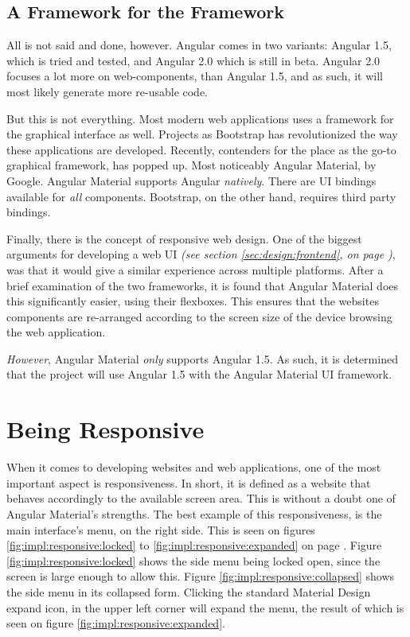 		\subsection{A Framework for the Framework}
			All is not said and done, however. Angular comes in two variants: Angular 1.5, which is tried and tested, and Angular 2.0 which is still in beta. Angular 2.0 focuses a lot more on web-components, than Angular 1.5, and as such, it will most likely generate more re-usable code. 

			But this is not everything. Most modern web applications uses a framework for the graphical interface as well. Projects as Bootstrap has revolutionized the way these applications are developed. Recently, contenders for the place as the go-to graphical framework, has popped up. Most noticeably Angular Material, by Google. Angular Material supports Angular \emph{natively}. There are UI bindings available for \emph{all} components. Bootstrap, on the other hand, requires third party bindings. 

			Finally, there is the concept of responsive web design. One of the biggest arguments for developing a web UI \emph{(see section \ref{sec:design:frontend}, on page \pageref{sec:design:frontend})}, was that it would give a similar experience across multiple platforms. After a brief examination of the two frameworks, it is found that Angular Material does this significantly easier, using their flexboxes. This ensures that the websites components are re-arranged according to the screen size of the device browsing the web application.

			\emph{However}, Angular Material \emph{only} supports Angular 1.5. As such, it is determined that the project will use Angular 1.5 with the Angular Material UI framework.



	\section{Being Responsive}
		When it comes to developing websites and web applications, one of the most important aspect is responsiveness. In short, it is defined as a website that behaves accordingly to the available screen area. This is without a doubt one of Angular Material's strengths. The best example of this responsiveness, is the main interface's menu, on the right side. This is seen on figures \ref{fig:impl:responsive:locked} to \ref{fig:impl:responsive:expanded} on page \pageref{fig:impl:responsive:locked}. Figure \ref{fig:impl:responsive:locked} shows the side menu being locked open, since the screen is large enough to allow this. Figure \ref{fig:impl:responsive:collapsed} shows the side menu in its collapsed form. Clicking the standard Material Design expand icon, in the upper left corner will expand the menu, the result of which is seen on figure \ref{fig:impl:responsive:expanded}.

